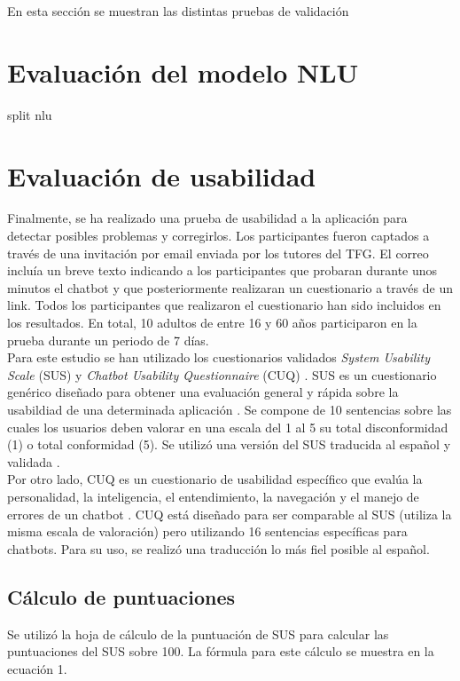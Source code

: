 En esta sección se muestran las distintas pruebas de validación\\
 

\section{Evaluación del modelo NLU}
split nlu 

\section{Evaluación de usabilidad}
Finalmente, se ha realizado una prueba de usabilidad a la aplicación para detectar posibles problemas y corregirlos. Los participantes fueron captados a través de una invitación por email enviada por los tutores del TFG. El correo incluía un breve texto indicando a los participantes que probaran durante unos minutos el chatbot y que posteriormente realizaran un cuestionario a través de un link. Todos los participantes que realizaron el cuestionario han sido incluidos en los resultados. En total, 10 adultos de entre 16 y 60 años participaron en la prueba durante un periodo de 7 días.\\

Para este estudio se han utilizado los cuestionarios validados \textit{System Usability Scale} (SUS) \cite{dirtySUS} y \textit{Chatbot Usability Questionnaire} (CUQ) \cite{cuq}. SUS es un cuestionario genérico diseñado para obtener una evaluación general y rápida sobre la usabildiad de una determinada aplicación \cite{dirtySUS}. Se compone de 10 sentencias sobre las cuales los usuarios deben valorar en una escala del 1 al 5 su total disconformidad (1) o total conformidad (5). Se utilizó una versión del SUS traducida al español y validada \cite{spanishSUS}.\\

Por otro lado, CUQ es un cuestionario de usabilidad específico que evalúa la personalidad, la inteligencia, el entendimiento, la navegación y el manejo de errores de un chatbot \cite{cuq}. CUQ está diseñado para ser comparable al SUS (utiliza la misma escala de valoración) pero utilizando 16 sentencias específicas para chatbots. Para su uso, se realizó una traducción lo más fiel posible al español.\\

\subsection{Cálculo de puntuaciones}
Se utilizó la hoja de cálculo de la puntuación de SUS \cite{susSpread} para calcular las puntuaciones del SUS sobre 100. La fórmula para este cálculo se muestra en la ecuación 1.\\


